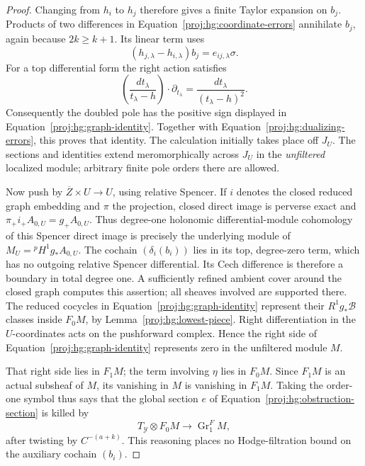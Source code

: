 \documentclass[11pt,letterpaper]{article}
\DeclareMathOperator{\Gr}{Gr}
\theoremstyle{definition}
\theoremstyle{remark}
\begin{document}
\begin{proof}
Changing from \(h_i\) to \(h_j\) therefore gives a finite Taylor
expansion on \(b_j\).  Products of two differences in
Equation~\eqref{proj:hg:coordinate-errors} annihilate \(b_j\), again
because \(2k\geq k+1\).  Its linear term uses
\[
 (h_{j,\lambda}-h_{i,\lambda})b_j
       =e_{ij,\lambda}\sigma.
\]
For a top differential form the right action satisfies
\[
 \left(\frac{dt_\lambda}{t_\lambda-h}\right)
       \cdot\partial_{t_\lambda}
   =\frac{dt_\lambda}{(t_\lambda-h)^2}.
\]
Consequently the doubled pole has the positive sign displayed in
Equation~\eqref{proj:hg:graph-identity}.  Together with
Equation~\eqref{proj:hg:dualizing-errors}, this proves that identity.
The calculation initially takes place off \(J_U\).  The sections
and identities extend meromorphically across \(J_U\) in the
\emph{unfiltered} localized module; arbitrary finite pole orders
there are allowed.

Now push by \(\overline Z\times U\to U\), using relative
Spencer.  If \(i\) denotes the closed reduced graph embedding and
\(\pi\) the projection, closed direct image is perverse exact and
\(\pi_+i_+A_{0,U}=g_+A_{0,U}\).  Thus degree-one holonomic
differential-module cohomology of this Spencer direct image is
precisely the underlying module of
\(M_U={}^{p}\!H^1g_*A_{0,U}\).
The cochain \((\delta_i(b_i))\) lies in its top,
degree-zero term, which has no outgoing relative Spencer
differential.  Its Cech difference is therefore a boundary in
total degree one.  A sufficiently refined ambient cover around
the closed graph computes this assertion; all sheaves involved
are supported there.  The reduced cocycles in
Equation~\eqref{proj:hg:graph-identity} represent their
\(R^1g_*\mathcal B\) classes inside \(F_0M\), by
Lemma~\ref{proj:hg:lowest-piece}.  Right differentiation in the
\(U\)-coordinates acts on the pushforward complex.
Hence the right side of Equation~\eqref{proj:hg:graph-identity}
represents zero in the unfiltered module \(M\).

That right side lies in \(F_1M\); the term involving \(\eta\)
lies in \(F_0M\).  Since \(F_1M\) is an actual subsheaf of \(M\),
its vanishing in \(M\) is vanishing in \(F_1M\).  Taking the
order-one symbol thus says that the global section \(e\) of
Equation~\eqref{proj:hg:obstruction-section} is killed by
\begin{equation}\label{proj:hg:symbol-map}
 T_{\mathcal Y}\otimes F_0M
           \longrightarrow \Gr^F_1M,
\end{equation}
after twisting by \(C^{-(a+k)}\).
This reasoning places no Hodge-filtration bound on the
auxiliary cochain \((b_i)\).


\end{proof}
\end{document}
